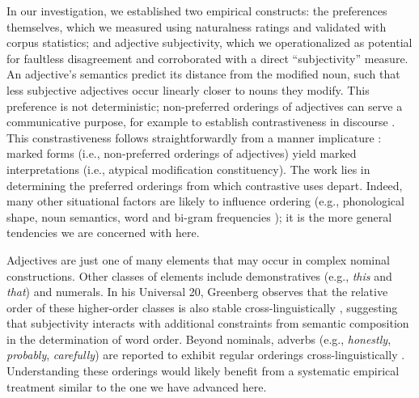 \documentclass{pnastwo}
\newcommand{\ndg}[1]{\textcolor{Green}{[ndg: #1]}}
\begin{document}
\begin{article}
In our investigation, we established two empirical constructs: the preferences themselves, which we measured using naturalness ratings and validated with corpus statistics; and adjective subjectivity, which we operationalized as potential for faultless disagreement and corroborated with a direct ``subjectivity'' measure. 
An adjective's semantics predict its distance from the modified noun, such that less subjective adjectives occur linearly closer to nouns they modify. 
This preference is not deterministic; non-preferred orderings of adjectives can serve a communicative purpose, for example to establish contrastiveness in discourse \cite{martin1969determinants,martin1970juncture,hill1960,vendler1963}. This constrastiveness follows straightforwardly from a manner implicature \cite{levinson2000}: marked forms (i.e., non-preferred orderings of adjectives) yield marked interpretations (i.e., atypical modification constituency). The work lies in determining the preferred orderings from which  contrastive uses depart. Indeed, many other situational factors are likely to influence ordering (e.g., phonological shape, noun semantics, word and bi-gram frequencies \cite{wulff2003}); it is the more general tendencies we are concerned with here.

Adjectives are just one of many elements that may occur in complex nominal constructions. Other classes of elements include demonstratives (e.g., \emph{this} and \emph{that}) and numerals. In his Universal 20, Greenberg observes that the relative order of these higher-order classes is also stable cross-linguistically \cite{greenberg1963,culbertsonadger2014}, suggesting that subjectivity interacts with additional constraints from semantic composition in the determination of word order. Beyond nominals, adverbs (e.g., \emph{honestly}, \emph{probably}, \emph{carefully}) are reported to exhibit regular orderings cross-linguistically \cite{cinque1999,ernst2002}. Understanding these orderings would likely benefit from a systematic empirical treatment similar to the one we have advanced here.



\end{article}
\end{document}
